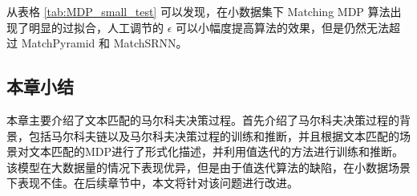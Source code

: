 从表格 \ref{tab:MDP_small_test} 可以发现，在小数据集下 Matching MDP 算法出现了明显的过拟合，人工调节的 $\epsilon$ 可以小幅度提高算法的效果，但是仍然无法超过 MatchPyramid 和 MatchSRNN。

\subsection{本章小结}
本章主要介绍了文本匹配的马尔科夫决策过程。首先介绍了马尔科夫决策过程的背景，包括马尔科夫链以及马尔科夫决策过程的训练和推断，并且根据文本匹配的场景对文本匹配的MDP进行了形式化描述，并利用值迭代的方法进行训练和推断。该模型在大数据量的情况下表现优异，但是由于值迭代算法的缺陷，在小数据场景下表现不佳。在后续章节中，本文将针对该问题进行改进。
